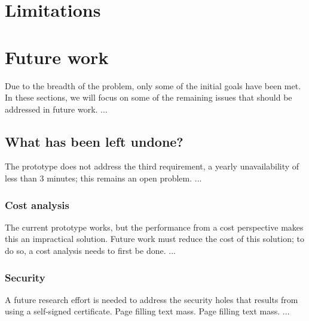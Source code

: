 \documentclass[
English,                 %
includepublications,    %
%
%
%
%
%
%
%
%
%
%
%
%
%
%
%
%
%
%
]{kththesis}
\begin{document}
\section{Limitations}
\label{sec:limitations}


\section{Future work}
\label{sec:futureWork}



Due to the breadth of the problem, only some of the initial goals have been
met. In these sections, we will focus on some of the remaining issues that
should be addressed in future work. ...

\subsection{What has been left undone?}
\label{sec:what-has-been-left-undone}

The prototype does not address the third requirement, \ie a yearly unavailability of less than 3 minutes; this remains an open problem. ...

\subsubsection{Cost analysis}
The current prototype works, but the performance from a cost perspective makes this an impractical solution. Future work must reduce the cost of this solution; to do so, a cost analysis needs to first be done. ...

\subsubsection{Security}
A future research effort is needed to address the security holes that results from using a self-signed certificate. Page filling text mass. Page filling text mass. ...
\end{document}
